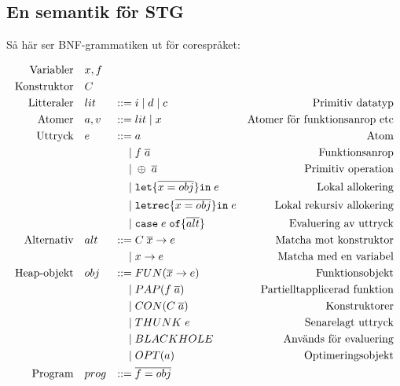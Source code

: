 \documentclass[../Core]{subfiles}
\begin{document}
\subsection{En semantik för STG}
\label{sec:SemStg}






Så här ser BNF-grammatiken ut för corespråket:


\begin{equation*}
\begin{aligned}
\text{Variabler} \quad & x,f \\
\text{Konstruktor} \quad & C \\
\text{Litteraler}\quad&lit&::=&\;i \; | \;  d \;|\; c&\text{Primitiv datatyp} \\
\text{Atomer}\quad&a, v&::=&\;lit \; | \; x&\text{Atomer för funktionsanrop etc} \\
\text{Uttryck}\quad&e&::=&\;a&\text{Atom} \\
    &&|&\;f \; \overline{a}&\text{Funktionsanrop} \\
    &&|&\;\oplus \; \overline{a}&\text{Primitiv operation} \\
    &&|&\;\mathtt{let \{} \overline{x = obj} \mathtt{ \} in } \; e&\text{Lokal allokering} \\
    &&|&\;\mathtt{letrec \{} \overline{x = obj} \mathtt{ \} in } \; e&\text{Lokal rekursiv allokering} \\
    &&|&\;\mathtt{case} \; e \;  \mathtt{ of \{ } \overline{alt} \mathtt{\}}&\text{Evaluering av uttryck} \\
\text{Alternativ}\quad&alt&::=&\;C \; \overline{x} \rightarrow e&\text{Matcha mot konstruktor} \\
    &&|&\;x \rightarrow e&\text{Matcha med en variabel} \\
\text{Heap-objekt}\quad&obj&::=&\;FUN(\overline{x} \rightarrow e)&\text{Funktionsobjekt} \\
    &&|&\;PAP(f \; \overline{a})&\text{Partielltapplicerad funktion} \\
    &&|&\;CON(C \; \overline{a})&\text{Konstruktorer} \\
    &&|&\;THUNK \; e&\text{Senarelagt uttryck} \\
    &&|&\;BLACKHOLE&\text{Används för evaluering} \\
    &&|&\;OPT(a)&\text{Optimeringsobjekt} \\
\text{Program}\quad&prog&::=&\;\overline{f=obj}&\text{}
\end{aligned}
\end{equation*}
\end{document}
